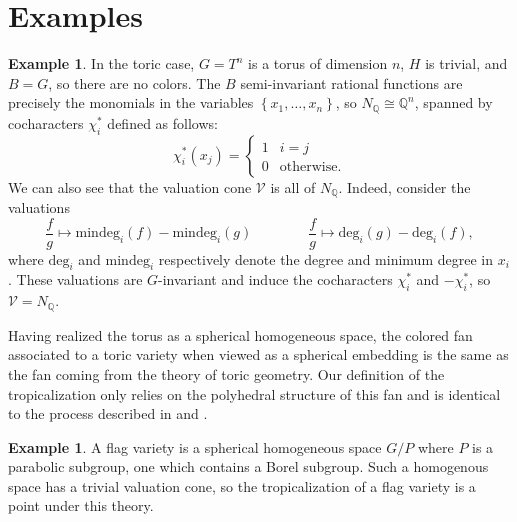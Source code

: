 \documentclass[12pt,twoside,cd]{amsart}
\theoremstyle{definition}
\newtheorem{example}[theorem]{Example}
\begin{document}
\section{Examples}\label{examples}

\begin{example}\label{toricex}
In the toric case, $G = T^n$ is a torus of dimension $n$, $H$ is trivial, and $B = G$, so there are no colors.
The $B$ semi-invariant rational functions are precisely the monomials in the variables ${\left\lbrace {x_1,\ldots,x_n} \right\rbrace}$, so $N_\mathbb{Q} \cong \mathbb{Q}^n$, spanned by cocharacters $\chi_i^*$ defined as follows:
\[
\chi^*_i(x_j) = \left\lbrace \begin{array}{ll}
1 & i = j \\
0 & \text{otherwise.}
\end{array}
\right.
\]
We can also see that the valuation cone $\mathcal{V}$ is all of $N_\mathbb{Q}$.
Indeed, consider the valuations
\[
\frac{f}{g} \mapsto \text{mindeg}_i(f) - \text{mindeg}_i(g) \qquad \qquad \frac{f}{g} \mapsto \text{deg}_i(g) - \text{deg}_i(f),
\]
where $\text{deg}_i$ and $\text{mindeg}_i$ respectively denote the degree and minimum degree in $x_i$.
These valuations are $G$-invariant and induce the cocharacters $\chi_i^*$ and $-\chi_i^\ast$, so $\mathcal{V} = N_\mathbb{Q}$.

Having realized the torus as a spherical homogeneous space, the colored fan associated to a toric variety when viewed as a spherical embedding is the same as the fan coming from the theory of toric geometry.
Our definition of the tropicalization only relies on the polyhedral structure of this fan and is identical to the process described in \cite{Ka} and \cite{Pay}.
\end{example}
\begin{example}\label{flag}
A flag variety is a spherical homogeneous space $G/P$ where $P$ is a parabolic subgroup, one which contains a Borel subgroup.
Such a homogenous space has a trivial valuation cone, so the tropicalization of a flag variety is a point under this theory.
\end{example}
\end{document}
